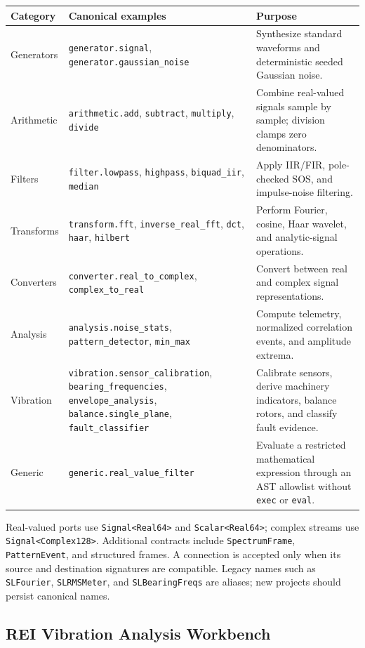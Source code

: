 \documentclass[10pt,a4paper]{article}
\newcommand{\code}[1]{\nolinkurl{#1}}
\begin{document}
\begin{tabularx}{\textwidth}{L{2.7cm}L{5.2cm}Y}
\toprule
Category & Canonical examples & Purpose\\
\midrule
Generators & \code{generator.signal}, \code{generator.gaussian\_noise} & Synthesize standard waveforms and deterministic seeded Gaussian noise.\\
Arithmetic & \code{arithmetic.add}, \code{subtract}, \code{multiply}, \code{divide} & Combine real-valued signals sample by sample; division clamps zero denominators.\\
Filters & \code{filter.lowpass}, \code{highpass}, \code{biquad\_iir}, \code{median} & Apply IIR/FIR, pole-checked SOS, and impulse-noise filtering.\\
Transforms & \code{transform.fft}, \code{inverse\_real\_fft}, \code{dct}, \code{haar}, \code{hilbert} & Perform Fourier, cosine, Haar wavelet, and analytic-signal operations.\\
Converters & \code{converter.real\_to\_complex}, \code{complex\_to\_real} & Convert between real and complex signal representations.\\
Analysis & \code{analysis.noise\_stats}, \code{pattern\_detector}, \code{min\_max} & Compute telemetry, normalized correlation events, and amplitude extrema.\\
Vibration & \code{vibration.sensor\_calibration}, \code{bearing\_frequencies}, \code{envelope\_analysis}, \code{balance.single\_plane}, \code{fault\_classifier} & Calibrate sensors, derive machinery indicators, balance rotors, and classify fault evidence.\\
Generic & \code{generic.real\_value\_filter} & Evaluate a restricted mathematical expression through an AST allowlist without \code{exec} or \code{eval}.\\
\bottomrule
\end{tabularx}

Real-valued ports use \code{Signal<Real64>} and \code{Scalar<Real64>}; complex streams use \code{Signal<Complex128>}. Additional contracts include \code{SpectrumFrame}, \code{PatternEvent}, and structured frames. A connection is accepted only when its source and destination signatures are compatible. Legacy names such as \code{SLFourier}, \code{SLRMSMeter}, and \code{SLBearingFreqs} are aliases; new projects should persist canonical names.

\subsection{REI Vibration Analysis Workbench}
\end{document}
